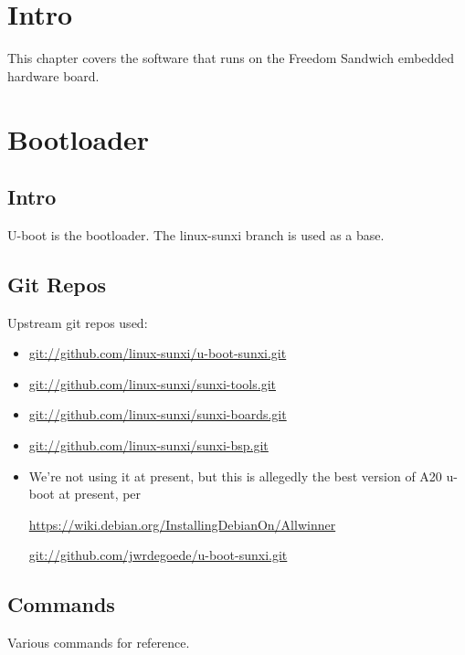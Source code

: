 %
%
%
%
%
\section{Intro}
This chapter covers the software that runs on the Freedom Sandwich embedded hardware board.


\section{Bootloader}
\subsection{Intro}
U-boot is the bootloader. The linux-sunxi branch is used as a base.

\subsection{Git Repos}
Upstream git repos used:
\begin{itemize}
  \item{\url{git://github.com/linux-sunxi/u-boot-sunxi.git}}
  \item{\url{git://github.com/linux-sunxi/sunxi-tools.git}}
  \item{\url{git://github.com/linux-sunxi/sunxi-boards.git}}
  \item{\url{git://github.com/linux-sunxi/sunxi-bsp.git}}
  \item{We're not using it at present, but this is allegedly the best version of
  A20 u-boot at present, per
  
  \url{https://wiki.debian.org/InstallingDebianOn/Allwinner}
  
  \url{git://github.com/jwrdegoede/u-boot-sunxi.git}
  }
\end{itemize}

\subsection{Commands}
Various commands for reference.

